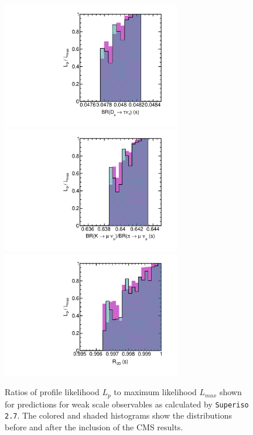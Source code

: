 \begin{figure}[htbp]
\begin{center}
\includegraphics[height=5.5cm]{figs/fig_Dstaunu_s.pdf} 
\includegraphics[height=5.5cm]{figs/fig_Kmunu_pimunu_s.pdf} \\
\includegraphics[height=5.5cm]{figs/fig_Rl23_s.pdf} 
\caption{Ratios of profile likelihood $L_p$ to maximum likelihood $L_{max}$ shown for predictions for weak scale observables as calculated by {\tt Superiso 2.7}.  The colored and shaded histograms show the distributions before and after the inclusion of the CMS results.}
\label{fig:LRwcms_EWobs_s2}
\end{center}
\end{figure}





